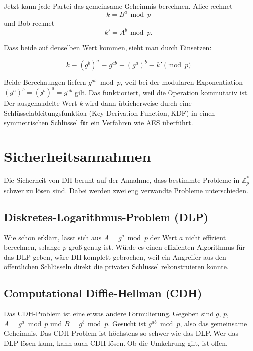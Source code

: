 \documentclass[conference]{IEEEtran}
\begin{document}
Jetzt kann jede Partei das gemeinsame Geheimnis berechnen. Alice
rechnet
\begin{equation}
    k = B^a \bmod p
\end{equation}
und Bob rechnet
\begin{equation}
    k' = A^b \bmod p.
\end{equation}

Dass beide auf denselben Wert kommen, sieht man durch Einsetzen:

\begin{equation}
    k \equiv (g^b)^a \equiv g^{ab} \equiv (g^a)^b \equiv k' \pmod p
\end{equation}

Beide Berechnungen liefern $g^{ab} \bmod p$, weil bei der modularen
Exponentiation $(g^a)^b = (g^b)^a = g^{ab}$ gilt. Das funktioniert,
weil die Operation kommutativ ist. Der ausgehandelte Wert $k$ wird
dann üblicherweise durch eine Schlüsselableitungsfunktion (Key
Derivation Function, KDF) in einen symmetrischen Schlüssel für ein
Verfahren wie AES überführt.

\section{Sicherheitsannahmen}

Die Sicherheit von DH beruht auf der Annahme, dass bestimmte Probleme
in $\mathbb{Z}_p^*$ schwer zu lösen sind. Dabei werden zwei eng
verwandte Probleme unterschieden.

\subsection{Diskretes-Logarithmus-Problem (DLP)}

Wie schon erklärt, lässt sich aus $A = g^a \bmod p$ der Wert $a$
nicht effizient berechnen, solange $p$ groß genug ist. Würde es einen
effizienten Algorithmus für das DLP geben, wäre DH komplett gebrochen,
weil ein Angreifer aus den öffentlichen Schlüsseln direkt die
privaten Schlüssel rekonstruieren könnte.

\subsection{Computational Diffie-Hellman (CDH)}

Das CDH-Problem ist eine etwas andere Formulierung. Gegeben sind
$g$, $p$, $A = g^a \bmod p$ und $B = g^b \bmod p$. Gesucht ist
$g^{ab} \bmod p$, also das gemeinsame Geheimnis. Das CDH-Problem ist
höchstens so schwer wie das DLP. Wer das DLP lösen kann, kann auch
CDH lösen. Ob die Umkehrung gilt, ist offen.
\end{document}

